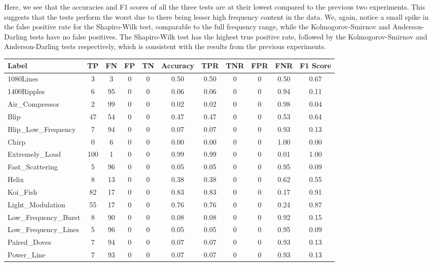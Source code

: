 \documentclass[12pt]{article}
\begin{document}
\noindent Here, we see that the accuracies and F1 scores of all the three tests are at their lowest compared to the previous two experiments. This suggests that the tests perform the worst due to there being lesser high frequency content in the data. We, again, notice a small spike in the false positive rate for the Shapiro-Wilk test, comparable to the full frequency range, while the Kolmogorov-Smirnov and Anderson-Darling tests have no false positives. The Shapiro-Wilk test has the highest true positive rate, followed by the Kolmogorov-Smirnov and Anderson-Darling tests respectively, which is consistent with the results from the previous experiments.

\begin{table}[H]
  \begin{tabular}{lcccccccccc}
  \toprule
  Label & TP & FN & FP & TN & Accuracy & TPR & TNR & FPR & FNR & F1 Score \\
  \midrule
  1080Lines & 3 & 3 & 0 & 0 & 0.50 & 0.50 & 0 & 0 & 0.50 & 0.67 \\
  1400Ripples & 6 & 95 & 0 & 0 & 0.06 & 0.06 & 0 & 0 & 0.94 & 0.11 \\
  Air\_Compressor & 2 & 99 & 0 & 0 & 0.02 & 0.02 & 0 & 0 & 0.98 & 0.04 \\
  Blip & 47 & 54 & 0 & 0 & 0.47 & 0.47 & 0 & 0 & 0.53 & 0.64 \\
  Blip\_Low\_Frequency & 7 & 94 & 0 & 0 & 0.07 & 0.07 & 0 & 0 & 0.93 & 0.13 \\
  Chirp & 0 & 6 & 0 & 0 & 0.00 & 0.00 & 0 & 0 & 1.00 & 0.00 \\
  Extremely\_Loud & 100 & 1 & 0 & 0 & 0.99 & 0.99 & 0 & 0 & 0.01 & 1.00 \\
  Fast\_Scattering & 5 & 96 & 0 & 0 & 0.05 & 0.05 & 0 & 0 & 0.95 & 0.09 \\
  Helix & 8 & 13 & 0 & 0 & 0.38 & 0.38 & 0 & 0 & 0.62 & 0.55 \\
  Koi\_Fish & 82 & 17 & 0 & 0 & 0.83 & 0.83 & 0 & 0 & 0.17 & 0.91 \\
  Light\_Modulation & 55 & 17 & 0 & 0 & 0.76 & 0.76 & 0 & 0 & 0.24 & 0.87 \\
  Low\_Frequency\_Burst & 8 & 90 & 0 & 0 & 0.08 & 0.08 & 0 & 0 & 0.92 & 0.15 \\
  Low\_Frequency\_Lines & 5 & 96 & 0 & 0 & 0.05 & 0.05 & 0 & 0 & 0.95 & 0.09 \\
  Paired\_Doves & 7 & 94 & 0 & 0 & 0.07 & 0.07 & 0 & 0 & 0.93 & 0.13 \\
  Power\_Line & 7 & 93 & 0 & 0 & 0.07 & 0.07 & 0 & 0 & 0.93 & 0.13 \\

\end{tabular}
\end{table}
\end{document}
